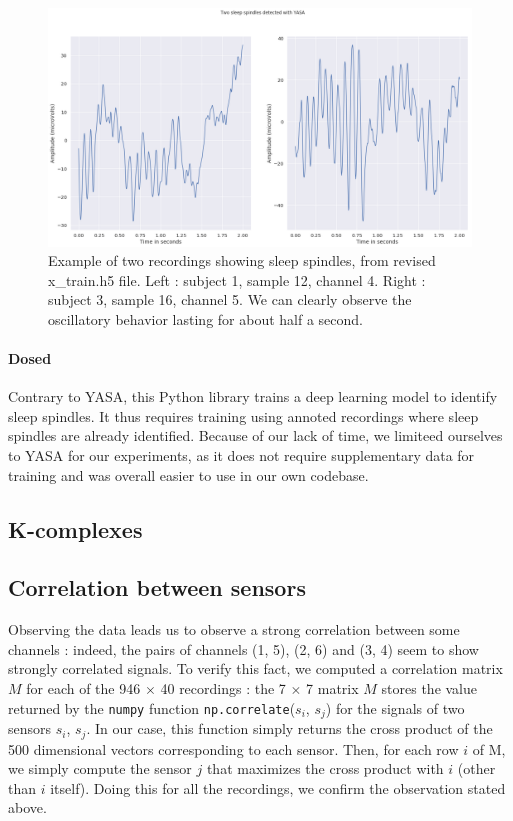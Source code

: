 \begin{figure}
	\includegraphics[width=\textwidth]{images/spindles_example.png}
	\caption{Example of two recordings showing sleep spindles, from revised x\_train.h5 file. Left : subject 1, sample 12, channel 4. Right : subject 3, sample 16, channel 5. We can clearly observe the oscillatory behavior lasting for about half a second.}
	\label{fig:spindles}
\end{figure}


\paragraph{Dosed} Contrary to YASA, this Python library trains a deep learning model to identify sleep spindles. It thus requires training using annoted recordings where sleep spindles are already identified.
Because of our lack of time, we limiteed ourselves to YASA for our experiments, as it does not require supplementary data for training and was overall easier to use in our own codebase. 

\subsection{K-complexes}

\subsection{Correlation between sensors}
\label{sensor_correlations}

Observing the data leads us to observe a strong correlation between some channels : indeed, the pairs of channels (1, 5), (2, 6) and (3, 4) seem to show strongly correlated signals. To verify this fact, we computed a correlation matrix $M$ for each of the 946 $\times$ 40 recordings : the 7 $\times$ 7 matrix $M$ stores the value returned by the \texttt{numpy} function \texttt{np.correlate}($s_i$, $s_j$) for the signals of two sensors $s_i$, $s_j$. In our case, this function simply returns the cross product of the 500 dimensional vectors corresponding to each sensor. Then, for each row $i$ of M, we simply compute the sensor $j$ that maximizes the cross product with $i$ (other than $i$ itself). Doing this for all the recordings, we confirm the observation stated above. 


